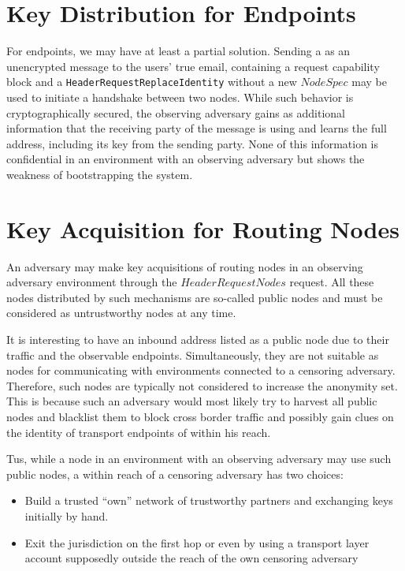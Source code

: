 \section{Key Distribution for Endpoints}
For endpoints, we may have at least a partial solution. Sending a \VortexMessage{} as an unencrypted message to the users' true email, containing a request capability block and a \texttt{HeaderRequestReplaceIdentity} without a new $NodeSpec$ may be used to initiate a handshake between two nodes. While such behavior is cryptographically secured, the observing adversary gains as additional information that the receiving party of the message is using \MessageVortex{} and learns the full address, including its key from the sending party. None of this information is confidential in an environment with an observing adversary but shows the weakness of bootstrapping the system.

\section{Key Acquisition for Routing Nodes}
An adversary may make key acquisitions of routing nodes in an observing adversary environment through the $HeaderRequestNodes$ request. All these nodes distributed by such mechanisms are so-called public nodes and must be considered as untrustworthy nodes at any time. 

It is interesting to have an inbound address listed as a public node due to their traffic and the observable endpoints. Simultaneously, they are not suitable as nodes for communicating with environments connected to a censoring adversary. Therefore, such nodes are typically not considered to increase the anonymity set. This is because such an adversary would most likely try to harvest all public nodes and blacklist them to block cross border traffic and possibly gain clues on the identity of transport endpoints of \VortexNodes{} within his reach.

Tus, while a node in an environment with an observing adversary may use such public nodes, a \VortexNode{} within reach of a censoring adversary has two choices:
\begin{itemize}
	\item Build a trusted ``own'' network of trustworthy partners and exchanging keys initially by hand.
	\item Exit the jurisdiction on the first hop or even by using a transport layer account supposedly outside the reach of the own censoring adversary
\end{itemize}

